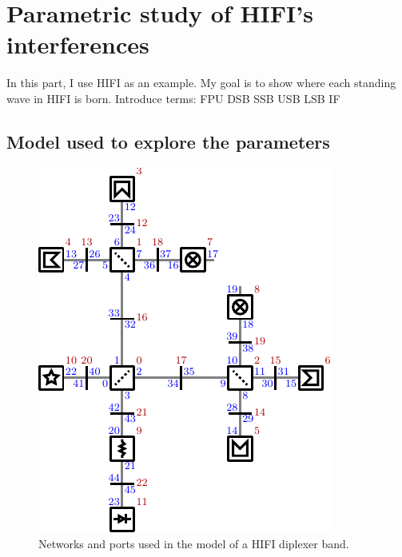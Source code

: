 \cleardoublepage
\chapter{Parametric study of HIFI's interferences}
\label{sec:chapter3}

In this part, I use HIFI as an example.
My goal is to show where each standing wave in HIFI is born.
Introduce terms:
FPU
DSB
SSB
USB
LSB
IF


\section{Model used to explore the parameters}

\begin{figure}[hbtp]
    \centering
    \includegraphics{ports_diplexerband}
    \caption{Networks and ports used in the model of a HIFI diplexer band.}
    \label{fig:ports_diplexerband}
\end{figure}

